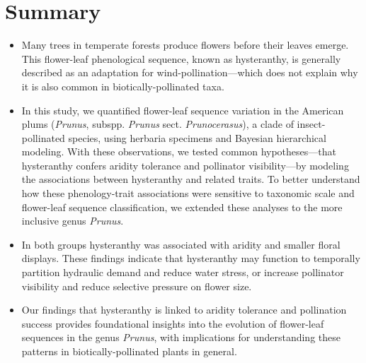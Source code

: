 \documentclass{article}[12pt]
\begin{document}
\section*{Summary} %
\begin{itemize}
\item Many trees in temperate forests produce flowers before their leaves emerge. This flower-leaf phenological sequence, known as hysteranthy, is generally described as an adaptation for wind-pollination---which does not explain why it is also common in biotically-pollinated taxa. 

\item In this study, we quantified flower-leaf sequence variation in the American plums (\emph{Prunus}, subspp. \emph{Prunus} sect. \emph{Prunocerasus}), a clade of insect-pollinated species, using herbaria specimens and Bayesian hierarchical modeling. With these observations, we tested common hypotheses---that hysteranthy confers aridity tolerance and pollinator visibility---by modeling the associations between hysteranthy and related traits. To better understand how these phenology-trait associations were sensitive to taxonomic scale and flower-leaf sequence classification, we extended these analyses to the more inclusive genus \emph{Prunus}. 

\item In both groups hysteranthy was associated with aridity and smaller floral displays. These findings indicate that hysteranthy may function to temporally partition hydraulic demand and reduce water stress, or increase pollinator visibility and reduce selective pressure on flower size.

\item %
Our findings that hysteranthy is linked to aridity tolerance and pollination success
provides foundational insights into the evolution of flower-leaf sequences in the genus \emph{Prunus}, with implications for understanding these patterns in biotically-pollinated plants in general.
\end{itemize}
\end{document}
